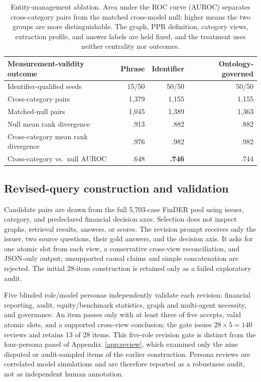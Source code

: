 \begin{table}[t]
\centering
\caption{Entity-management ablation. Area under the ROC curve (AUROC) separates cross-category pairs from the matched cross-model null; higher means the two groups are more distinguishable. The graph, PPR definition, category views, extraction profile, and answer labels are held fixed, and the treatment uses neither centrality nor outcomes.}
\label{tab:entity-ablation}
\small
\begin{tabular}{lrrr}
\toprule
Measurement-validity outcome & Phrase & Identifier & Ontology-governed\\
\midrule
Identifier-qualified seeds & 15/50 & 50/50 & 50/50\\
Cross-category pairs & 1,379 & 1,155 & 1,155\\
Matched-null pairs & 1,045 & 1,389 & 1,363\\
Null mean rank divergence & .913 & .882 & .882\\
Cross-category mean rank divergence & .976 & .982 & .982\\
Cross-category vs.\ null AUROC & .648 & \textbf{.746} & .744\\
\bottomrule
\end{tabular}
\end{table}

\subsection{Revised-query construction and validation}
\label{app:queries}
Candidate pairs are drawn from the full 5,703-case FinDER pool using issuer, category, and predeclared financial decision axes. Selection does not inspect graphs, retrieval results, answers, or scores. The revision prompt receives only the issuer, two source questions, their gold answers, and the decision axis. It asks for one atomic slot from each view, a conservative cross-view reconciliation, and JSON-only output; unsupported causal claims and simple concatenation are rejected. The initial 28-item construction is retained only as a failed exploratory audit.

Five blinded role/model personas independently validate each revision: financial reporting, audit, equity/benchmark statistics, graph and multi-agent necessity, and governance. An item passes only with at least three of five accepts, valid atomic slots, and a supported cross-view conclusion; the gate issues $28\times5=140$ reviews and retains 13 of 28 items. This five-role revision gate is distinct from the four-persona panel of Appendix~\ref{app:review}, which examined only the nine disputed or audit-sampled items of the earlier construction. Persona reviews are correlated model simulations and are therefore reported as a robustness audit, not as independent human annotation.

